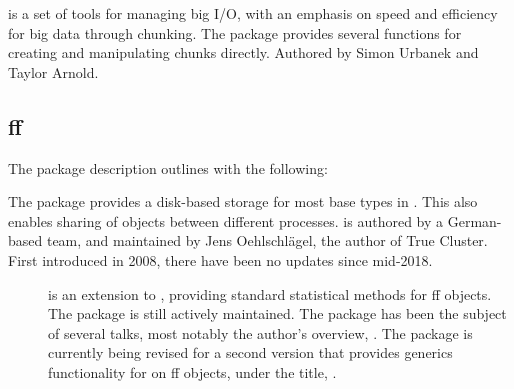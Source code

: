  is a set of tools for managing big I/O, with an emphasis on
speed and efficiency for big data through chunking\cite{urbanek20b}. The
package provides several functions for creating and manipulating chunks
directly. Authored by Simon Urbanek and Taylor Arnold.

\subsection{ff}\label{subsec:ff}

The package description outlines  with the following:


The package provides a disk-based storage for most base types in \R{}. This
also enables sharing of objects between different \R{} processes.  is
authored by a German-based team, and maintained by Jens Oehlschlägel,
the author of True Cluster. First introduced in
2008\cite{adler08:_large_r}, there have been no updates since
mid-2018.

\begin{description}
\item[\cite{jonge20}]
        is an extension to , providing standard statistical methods for ff
        objects. The package is still actively maintained. The package has been
        the subject of several talks, most notably the author's overview,
        \cite{wijffels13}. The package is currently being revised for a second
        version that provides generics functionality for  on ff objects,
        under the title, \cite{jonge15}.
\end{description}
